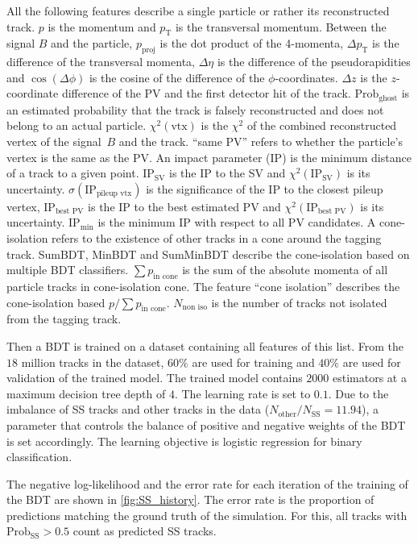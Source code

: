 All the following features describe a single particle or rather its reconstructed track.
%
$p$ is the momentum and
$p_\text{T}$ is the transversal momentum. 
%
Between the signal $B$ and the particle,
$p_\text{proj}$ is the dot product of the 4-momenta,
$\Delta p_\text{T}$ is the difference of the transversal momenta,    
$\Delta \eta$ is the difference of the pseudorapidities and   
$\cos(\Delta \phi)$ is the cosine of the difference of the $\phi$-coordinates. 
$\Delta z$ is the $z$-coordinate difference of the PV and the first detector hit of the track. 
%  
$\text{Prob}_\text{ghost}$ is an estimated probability that the track is falsely reconstructed and does not belong to an actual particle. 
$\chi^2(\text{vtx})$ is the $\chi^2$ of the combined reconstructed vertex of the signal~$B$ and the track. 
\enquote{same PV} refers to whether the particle's vertex is the same as the PV.
%
An impact parameter (IP) is the minimum distance of a track to a given point.
$\text{IP}_\text{SV}$ is the IP to the SV and  
$\chi^2(\text{IP}_\text{SV})$ is its uncertainty.
$\sigma(\text{IP}_\text{pileup vtx})$ is the significance of the IP to the closest pileup vertex,
$\text{IP}_\text{best PV}$ is the IP to the best estimated PV and  
$\chi^2(\text{IP}_\text{best PV})$ is its uncertainty.
$\text{IP}_\text{min}$ is the minimum IP with respect to all PV candidates.
%
A cone-isolation refers to the existence of other tracks in a cone around the tagging track.
SumBDT,    
MinBDT and    
SumMinBDT describe the cone-isolation based on multiple BDT classifiers.
$\sum p_\text{in cone}$ is the sum of the absolute momenta of all particle tracks in cone-isolation cone.
The feature \enquote{cone isolation} describes the cone-isolation based $p/\sum p_\text{in cone}$. 
$N_\text{non iso}$ is the number of tracks not isolated from the tagging track.   

Then a BDT is trained on a dataset containing all features of this list.
From the $18$ million tracks in the dataset, $60\%$ are used for training and $40\%$ are used for validation of the trained model.
The trained model contains $2000$ estimators at a maximum decision tree depth of $4$.
The learning rate is set to $0.1$.
Due to the imbalance of SS tracks and other tracks in the data ($N_\text{other}/N_\text{SS} = 11.94$), a parameter that controls the balance of positive and negative weights of the BDT is set accordingly. 
The learning objective is logistic regression for binary classification.

The negative log-likelihood and the error rate for each iteration of the training of the BDT are shown in \autoref{fig:SS_history}.
The error rate is the proportion of predictions matching the ground truth of the simulation.
For this, all tracks with $\text{Prob}_\text{SS}>0.5$ count as predicted SS tracks. 

